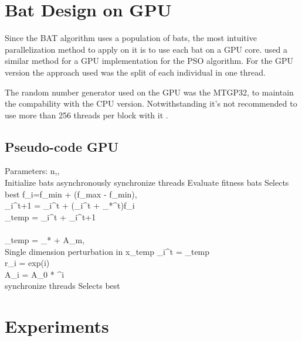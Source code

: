 \documentclass[conference]{IEEEtran}
\begin{document}
\section{Bat Design on GPU}

Since the BAT algorithm uses a population of bats, the most intuitive
parallelization method to apply on it is to use each bat on a GPU core.
\cite{pso-gpu} used a similar method for a GPU implementation for the PSO algorithm.
For the GPU version the approach used was the split of each individual in one thread.

The random number generator used on the GPU was the MTGP32, to
maintain the compability with the CPU version. Notwithstanding it's
not recommended to use more than 256 threads per block with it
\cite{curandIssue}.

\subsection{Pseudo-code GPU}
\newpage
\begin{algorithmic}
\begin{ALC@g}
\STATE Parameters: n,\alpha, \lambda\\
\STATE Initialize bats asynchronously
\STATE synchronize threads
\STATE Evaluate fitness bats
\STATE Selects best
        \STATE f_i=f_{min} + (f_{max} - f_{min})\beta, \in \beta [0,1]\\
        \STATE {}_i^{t+1} = _i^{t} + (_i^{t} + _*^{t})f_i\\
        \STATE {}_{temp} = _i^{t} + _i^{t+1}\\
        \\
            \STATE {}_{temp} = _* + \epsilon A_m, \epsilon \in [-1, 1]\\
        \ENDIF
        \STATE Single dimension perturbation in x_{temp}
            \STATE {}_i^t = _{temp}\\
            \STATE r_i = exp(\lambda * i)\\
            \STATE A_i =  A_{0} * \alpha^i\\
        \ENDIF
        \STATE synchronize threads
        \STATE Selects best
    \ENDFOR
\ENDWHILE
\end{ALC@g}
\end{algorithmic}

\section{Experiments}
\end{document}
